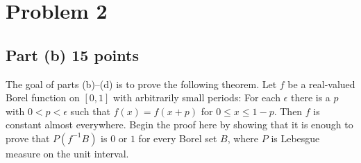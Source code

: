 \documentclass[letterpaper, 12pt]{article}
\begin{document}
\pagebreak

\section*{Problem 2}
\subsection*{Part (b) 15 points}
The goal of parts (b)--(d) is to prove the
following theorem.  Let $f$ be a real-valued Borel function on $[0,1]$ with
arbitrarily small periods:  For each $\epsilon$ there is a $p$ with $0 < p <
\epsilon$ such that $f(x) = f(x + p)$ for $0 \leq x \leq 1-p$.  Then $f$ is
constant almost everywhere.  Begin the proof here by showing that it is
enough to prove that $P(f^{-1}B)$ is $0$ or $1$ for every Borel set $B$,
where $P$ is Lebesgue measure on the unit interval.
\end{document}
